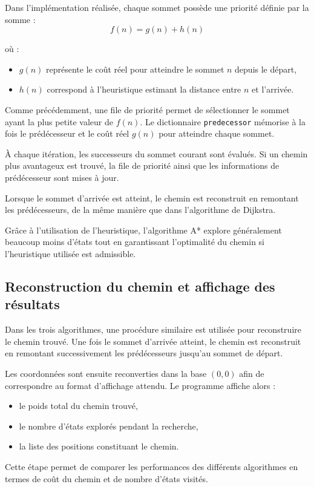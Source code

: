 \documentclass[a4paper,12pt]{article}
\begin{document}
Dans l’implémentation réalisée, chaque sommet possède une priorité définie par la somme :
\[
f(n) = g(n) + h(n)
\]

où :
\begin{itemize}
\item $g(n)$ représente le coût réel pour atteindre le sommet $n$ depuis le départ,
\item $h(n)$ correspond à l’heuristique estimant la distance entre $n$ et l’arrivée.
\end{itemize}

Comme précédemment, une file de priorité permet de sélectionner le sommet ayant la plus petite valeur de $f(n)$. Le dictionnaire \texttt{predecessor} mémorise à la fois le prédécesseur et le coût réel $g(n)$ pour atteindre chaque sommet.

À chaque itération, les successeurs du sommet courant sont évalués. Si un chemin plus avantageux est trouvé, la file de priorité ainsi que les informations de prédécesseur sont mises à jour.

Lorsque le sommet d’arrivée est atteint, le chemin est reconstruit en remontant les prédécesseurs, de la même manière que dans l’algorithme de Dijkstra.

Grâce à l’utilisation de l’heuristique, l’algorithme A* explore généralement beaucoup moins d’états tout en garantissant l’optimalité du chemin si l’heuristique utilisée est admissible.

\subsection{Reconstruction du chemin et affichage des résultats}

Dans les trois algorithmes, une procédure similaire est utilisée pour reconstruire le chemin trouvé. Une fois le sommet d’arrivée atteint, le chemin est reconstruit en remontant successivement les prédécesseurs jusqu’au sommet de départ.

Les coordonnées sont ensuite reconverties dans la base $(0,0)$ afin de correspondre au format d’affichage attendu. Le programme affiche alors :
\begin{itemize}
\item le poids total du chemin trouvé,
\item le nombre d’états explorés pendant la recherche,
\item la liste des positions constituant le chemin.
\end{itemize}

Cette étape permet de comparer les performances des différents algorithmes en termes de coût du chemin et de nombre d’états visités.
\end{document}
